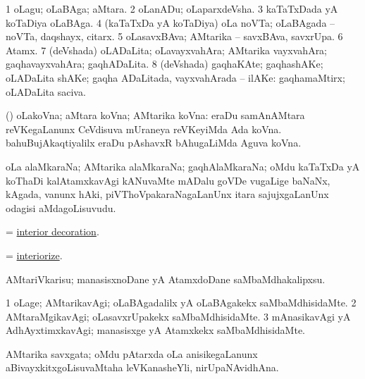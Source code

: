 \bentry
{}
\gl{\nA}
\bmng
\bnum
\num{1} oLagu; oLaBAga; aMtara. 
\num{2} oLanADu; oLaparxdeVsha. 
\num{3} kaTaTxDada yA koTaDiya oLaBAga. 
\num{4} (kaTaTxDa yA koTaDiya) oLa noVTa; oLaBAgada -- noVTa, daqshayx, citarx. 
\num{5} oLasavxBAva; AMtarika -- savxBAva, savxrUpa. 
\num{6} Atamx. 
\num{7} (deVshada) oLADaLita; oLavayxvahAra; AMtarika vayxvahAra; gaqhavayxvahAra; gaqhADaLita. 
\num{8} (deVshada) gaqhaKAte; gaqhashAKe; oLADaLita shAKe; gaqha ADaLitada, vayxvahArada -- ilAKe:  gaqhamaMtirx; oLADaLita saciva. 
\enum
\emng
\eentry

\bentry
{}
\gl{\nA}
\bmng
(\jAyx) oLakoVna; aMtara koVna; AMtarika koVna: 
\banum
{} eraDu samAnAMtara reVKegaLanunx CeVdisuva mUraneya reVKeyiMda Ada koVna. 
 bahuBujAkaqtiyalilx eraDu pAshavxR bAhugaLiMda Aguva koVna.  
\eanum
\emng
\eentry

\bentry
{}
\gl{\nA}
\bmng
oLa alaMkaraNa; AMtarika alaMkaraNa; gaqhAlaMkaraNa; oMdu kaTaTxDa yA koThaDi kalAtamxkavAgi kANuvaMte mADalu goVDe \mo vugaLige baNaNx, kAgada, \mo vanunx hAki, piVThoVpakaraNagaLanUnx itara sajujxgaLanUnx odagisi aMdagoLisuvudu. 
\emng
\eentry

\bentry
{}
\gl{\nA}
\bmng
=  \hyperlink{interior decoration}{interior decoration}. 
\emng
\eentry

\bentry
{}
\gl{\sakirx}
\bmng
= \hyperlink{interiorize}{interiorize}. 
\emng
\eentry

\bentry
{}
\gl{\sakirx}
\bmng
AMtariVkarisu; manasisxnoDane yA AtamxdoDane saMbaMdhakalipxsu. 
\emng
\eentry

\bentry
{}
\gl{\kirxvi}
\bmng
\bnum
\num{1} oLage; AMtarikavAgi; oLaBAgadalilx yA oLaBAgakekx saMbaMdhisidaMte. 
\num{2} AMtaraMgikavAgi; oLasavxrUpakekx saMbaMdhisidaMte. 
\num{3} mAnasikavAgi yA AdhAyxtimxkavAgi; manasisxge yA Atamxkekx saMbaMdhisidaMte. 
\enum
\emng
\eentry

\bentry
{}
\gl{\nA}
\bmng
AMtarika savxgata; oMdu pAtarxda oLa anisikegaLanunx aBivayxkitxgoLisuvaMtaha leVKanasheYli, nirUpaNAvidhAna. 
\emng
\eentry

